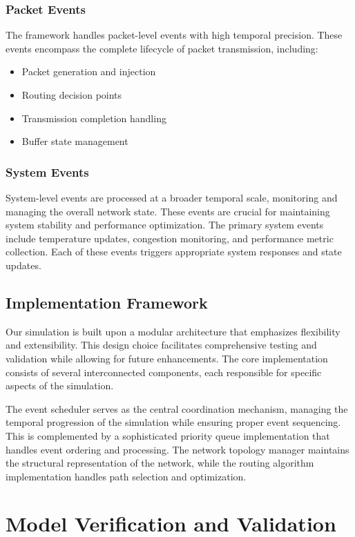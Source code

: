 \documentclass[12pt]{article}
\begin{document}
\subsubsection{Packet Events}
The framework handles packet-level events with high temporal precision. These events encompass the complete lifecycle of packet transmission, including:
\begin{itemize}[noitemsep]
    \item Packet generation and injection
    \item Routing decision points
    \item Transmission completion handling
    \item Buffer state management
\end{itemize}

\subsubsection{System Events}
System-level events are processed at a broader temporal scale, monitoring and managing the overall network state. These events are crucial for maintaining system stability and performance optimization. The primary system events include temperature updates, congestion monitoring, and performance metric collection. Each of these events triggers appropriate system responses and state updates.

\subsection{Implementation Framework}
Our simulation is built upon a modular architecture that emphasizes flexibility and extensibility. This design choice facilitates comprehensive testing and validation while allowing for future enhancements. The core implementation consists of several interconnected components, each responsible for specific aspects of the simulation.

The event scheduler serves as the central coordination mechanism, managing the temporal progression of the simulation while ensuring proper event sequencing. This is complemented by a sophisticated priority queue implementation that handles event ordering and processing. The network topology manager maintains the structural representation of the network, while the routing algorithm implementation handles path selection and optimization.

\section{Model Verification and Validation}
\end{document}
